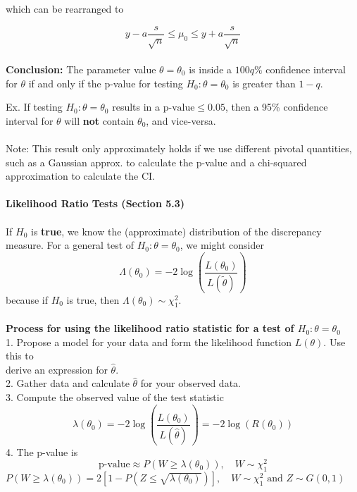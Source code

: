 \documentclass[a4paper,12pt]{article}
\begin{document}
which can be rearranged to

\[
y - a \frac{s}{\sqrt{n}} \leq \mu_0 \leq y + a \frac{s}{\sqrt{n}}
\]
\\\textbf{Conclusion:} The parameter value \( \theta = \theta_0 \) is inside a \( 100q\% \) confidence interval for \( \theta \) if and only if the p-value for testing \( H_0 : \theta = \theta_0 \) is greater than \( 1 - q \).

Ex. If testing \( H_0 : \theta = \theta_0 \) results in a \( \text{p-value} \leq 0.05 \), then a 95\% confidence interval for \( \theta \) will \textbf{not} contain \( \theta_0 \), and vice-versa.
\\
\\ Note: This result only approximately holds if we use different pivotal
quantities, such as a Gaussian approx. to calculate the p-value and a chi-squared approximation to calculate the CI.
\\
\\\textbf{Likelihood Ratio Tests (Section 5.3)}
\\
\\If \( H_0 \) is \textbf{true}, we know the (approximate) distribution of the discrepancy measure. For a general test of \( H_0 : \theta = \theta_0 \), we might consider
\[
\Lambda(\theta_0) = -2 \log \left( \frac{L(\theta_0)}{L(\tilde{\theta})} \right)
\]
because if \( H_0 \) is true, then \( \Lambda(\theta_0) \sim \chi^2_1 \).
\\
\\\textbf{Process for using the likelihood
ratio statistic for a test of $H_0 : \theta = \theta_0$}
\\1. Propose a model for your data and form the likelihood function \( L(\theta) \). Use this to \\derive an expression for \( \hat{\theta} \).
\\2. Gather data and calculate \( \hat{\theta} \) for your observed data.
\\3. Compute the observed value of the test statistic
\[
\lambda(\theta_0) = -2 \log \left( \frac{L(\theta_0)}{L(\hat{\theta})} \right) = -2 \log(R(\theta_0))
\]
4. The p-value is
\[
\text{p-value} \approx P(W \geq \lambda(\theta_0)), \quad W \sim \chi^2_1
\]
$P(W \geq \lambda(\theta_0)) = 2 \left[ 1 - P\left( Z \leq \sqrt{\lambda(\theta_0)} \right) \right], \quad W \sim \chi^2_1 \text{ and } Z \sim G(0, 1)$
\end{document}
